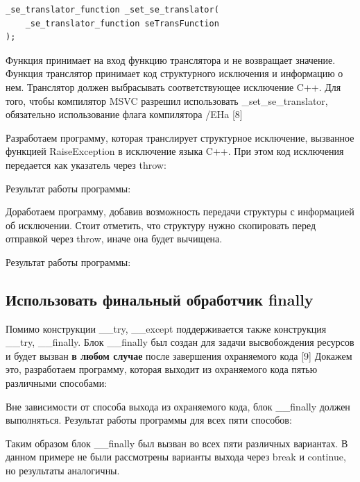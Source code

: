\documentclass[14pt,a4paper,report]{report}
\begin{document}
\begin{lstlisting}
_se_translator_function _set_se_translator(  
    _se_translator_function seTransFunction  
);  
\end{lstlisting}

Функция принимает на вход функцию транслятора и не возвращает значение. Функция транслятор принимает код структурного исключения и информацию о нем. Транслятор должен выбрасывать соответствующее исключение C++. Для того, чтобы компилятор MSVC разрешил использовать \_set\_se\_translator, обязательно использование флага компилятора /EHa [8]

Разработаем программу, которая транслирует структурное исключение, вызванное функцией RaiseException в исключение языка C++. При этом код исключения передается как указатель через throw:



Результат работы программы:



Доработаем программу, добавив возможность передачи структуры с информацией об исключении. Стоит отметить, что структуру нужно скопировать перед отправкой через throw, иначе она будет вычищена. 



Результат работы программы:



\subsection{Использовать финальный обработчик finally}

Помимо конструкции \_\_try, \_\_except поддерживается также конструкция \_\_try, \_\_finally. Блок \_\_finally был создан для задачи высвобождения ресурсов и будет вызван \textbf{в любом случае} после завершения охраняемого кода [9] Докажем это, разработаем программу, которая выходит из охраняемого кода пятью различными способами:



Вне зависимости от способа выхода из охраняемого кода, блок \_\_finally должен выполняться. Результат работы программы для всех пяти способов:



Таким образом блок \_\_finally был вызван во всех пяти различных вариантах. В данном примере не были рассмотрены варианты выхода через break и continue, но результаты аналогичны.
\end{document}
